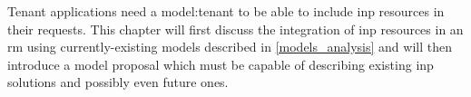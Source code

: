 Tenant applications need a \gls{model:tenant} to be able to include \gls{inp} resources in their requests.
This chapter will first discuss the integration of \gls{inp} resources in an \gls{rm} using currently-existing models described in \autoref{models_analysis} and will then introduce a model proposal which must be capable of describing existing \gls{inp} solutions and possibly even future ones.